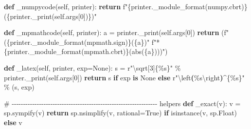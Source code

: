 \documentclass[
  letterpaper,
  DIV=11,
  numbers=noendperiod]{scrreprt}
\newenvironment{Shaded}{\begin{snugshade}}{\end{snugshade}}
\newcommand{\BuiltInTok}[1]{\textcolor[rgb]{0.00,0.23,0.31}{#1}}
\newcommand{\CharTok}[1]{\textcolor[rgb]{0.13,0.47,0.30}{#1}}
\newcommand{\CommentTok}[1]{\textcolor[rgb]{0.37,0.37,0.37}{#1}}
\newcommand{\ControlFlowTok}[1]{\textcolor[rgb]{0.00,0.23,0.31}{\textbf{#1}}}
\newcommand{\DecValTok}[1]{\textcolor[rgb]{0.68,0.00,0.00}{#1}}
\newcommand{\ErrorTok}[1]{\textcolor[rgb]{0.68,0.00,0.00}{#1}}
\newcommand{\KeywordTok}[1]{\textcolor[rgb]{0.00,0.23,0.31}{\textbf{#1}}}
\newcommand{\NormalTok}[1]{\textcolor[rgb]{0.00,0.23,0.31}{#1}}
\newcommand{\OperatorTok}[1]{\textcolor[rgb]{0.37,0.37,0.37}{#1}}
\newcommand{\PreprocessorTok}[1]{\textcolor[rgb]{0.68,0.00,0.00}{#1}}
\newcommand{\SpecialCharTok}[1]{\textcolor[rgb]{0.37,0.37,0.37}{#1}}
\newcommand{\SpecialStringTok}[1]{\textcolor[rgb]{0.13,0.47,0.30}{#1}}
\newcommand{\StringTok}[1]{\textcolor[rgb]{0.13,0.47,0.30}{#1}}
\newcommand{\VariableTok}[1]{\textcolor[rgb]{0.07,0.07,0.07}{#1}}
\newcommand{\VerbatimStringTok}[1]{\textcolor[rgb]{0.13,0.47,0.30}{#1}}
\theoremstyle{plain}
\theoremstyle{plain}
\theoremstyle{definition}
\theoremstyle{definition}
\theoremstyle{definition}
\theoremstyle{plain}
\theoremstyle{plain}
\theoremstyle{remark}
\begin{document}
\begin{Shaded}
\begin{Highlighting}[]
    \KeywordTok{def}\NormalTok{ \_numpycode(}\VariableTok{self}\NormalTok{, printer):}
        \ControlFlowTok{return} \SpecialStringTok{f"}\SpecialCharTok{\{}\NormalTok{printer}\SpecialCharTok{.}\NormalTok{\_module\_format(}\StringTok{\textquotesingle{}numpy.cbrt\textquotesingle{}}\NormalTok{)}\SpecialCharTok{\}}\SpecialStringTok{(}\SpecialCharTok{\{}\NormalTok{printer}\SpecialCharTok{.}\NormalTok{\_print(}\VariableTok{self}\NormalTok{.args[}\DecValTok{0}\NormalTok{])}\SpecialCharTok{\}}\SpecialStringTok{)"}

    \KeywordTok{def}\NormalTok{ \_mpmathcode(}\VariableTok{self}\NormalTok{, printer):}
\NormalTok{        a }\OperatorTok{=}\NormalTok{ printer.\_print(}\VariableTok{self}\NormalTok{.args[}\DecValTok{0}\NormalTok{])}
        \ControlFlowTok{return}\NormalTok{ (}\SpecialStringTok{f"(}\SpecialCharTok{\{}\NormalTok{printer}\SpecialCharTok{.}\NormalTok{\_module\_format(}\StringTok{\textquotesingle{}mpmath.sign\textquotesingle{}}\NormalTok{)}\SpecialCharTok{\}}\SpecialStringTok{(}\SpecialCharTok{\{}\NormalTok{a}\SpecialCharTok{\}}\SpecialStringTok{)"}
                \SpecialStringTok{f"*}\SpecialCharTok{\{}\NormalTok{printer}\SpecialCharTok{.}\NormalTok{\_module\_format(}\StringTok{\textquotesingle{}mpmath.cbrt\textquotesingle{}}\NormalTok{)}\SpecialCharTok{\}}\SpecialStringTok{(abs(}\SpecialCharTok{\{}\NormalTok{a}\SpecialCharTok{\}}\SpecialStringTok{)))"}\NormalTok{)}

    \KeywordTok{def}\NormalTok{ \_latex(}\VariableTok{self}\NormalTok{, printer, exp}\OperatorTok{=}\VariableTok{None}\NormalTok{):}
\NormalTok{        s }\OperatorTok{=} \VerbatimStringTok{r"}\DecValTok{\textbackslash{}s}\VerbatimStringTok{qrt}\PreprocessorTok{[3]}\VerbatimStringTok{\{\%s\}"} \OperatorTok{\%}\NormalTok{ printer.\_print(}\VariableTok{self}\NormalTok{.args[}\DecValTok{0}\NormalTok{])}
        \ControlFlowTok{return}\NormalTok{ s }\ControlFlowTok{if}\NormalTok{ exp }\KeywordTok{is} \VariableTok{None} \ControlFlowTok{else} \VerbatimStringTok{r"}\ErrorTok{\textbackslash{}}\VerbatimStringTok{left}\KeywordTok{(}\VerbatimStringTok{\%s}\CharTok{\textbackslash{}r}\VerbatimStringTok{ight}\KeywordTok{)}\DecValTok{\^{}}\VerbatimStringTok{\{\%s\}"} \OperatorTok{\%}\NormalTok{ (s, exp)}


\CommentTok{\# {-}{-}{-}{-}{-}{-}{-}{-}{-}{-}{-}{-}{-}{-}{-}{-}{-}{-}{-}{-}{-}{-}{-}{-}{-}{-}{-}{-}{-}{-}{-}{-}{-}{-}{-}{-}{-}{-}{-}{-}{-}{-}{-}{-}{-}{-}{-}{-}{-}{-}{-}{-}{-}{-}{-}{-}{-}{-}{-}{-}{-}{-}{-}{-} helpers}
\KeywordTok{def}\NormalTok{ \_exact(v):}
\NormalTok{    v }\OperatorTok{=}\NormalTok{ sp.sympify(v)}
    \ControlFlowTok{return}\NormalTok{ sp.nsimplify(v, rational}\OperatorTok{=}\VariableTok{True}\NormalTok{) }\ControlFlowTok{if} \BuiltInTok{isinstance}\NormalTok{(v, sp.Float) }\ControlFlowTok{else}\NormalTok{ v}



\end{Highlighting}
\end{Shaded}
\end{document}
